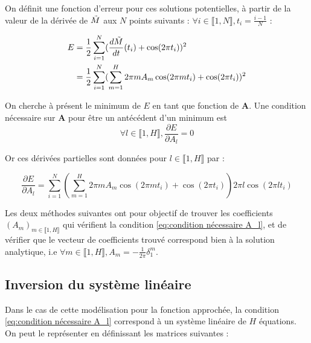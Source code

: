 \documentclass[12pt]{report}
\begin{document}
On définit une fonction d'erreur pour ces solutions potentielles, à partir de la valeur de la dérivée de $\Tilde{M}$ aux $N$ points suivants : $\forall i \in\llbracket 1,N \rrbracket, t_i = \frac{i-1}{N} $ :



\begin{equation}
    \begin{aligned}
        E &= \frac{1}{2}\sum_{i=1}^{N} (\frac{d\Tilde{M}}{dt}(t_i) +\cos(2\pi t_i))^2   \\
          &= \frac{1}{2}\sum_{i=1}^{N}(\sum_{m=1}^{H} 2\pi m A_m \cos(2\pi m t_i)+\cos(2\pi t_i))^2 
    \end{aligned}
\label{eq:fonction d'erreur}
\end{equation}

On cherche à présent le minimum de $E$ en tant que fonction de $\bm{A}$. Une condition nécessaire sur $\bm{A}$ pour être un antécédent d'un minimum est 
\begin{equation}
    {\forall l \in\llbracket 1,H \rrbracket, \frac{\partial E}{\partial A_l} = 0}
    \label{eq:condition nécessaire A_l}
\end{equation}

Or ces dérivées partielles sont données pour $l \in \llbracket 1,H \rrbracket$ par :

\begin{equation}
    \frac{\partial E}{\partial A_l} = 
    \sum_{i=1}^{N}(\sum_{m=1}^{H} 2\pi m A_m \cos(2\pi m t_i)+\cos(2\pi t_i))
    2\pi l \cos(2\pi l t_i)
\label{eq:gradient}
\end{equation}


Les deux méthodes suivantes ont pour objectif de trouver les coefficients $(A_m)_{m\in \llbracket 1,H \rrbracket}$ qui vérifient la condition \ref{eq:condition nécessaire A_l}, et de vérifier que le vecteur de coefficients trouvé correspond bien à la solution analytique, i.e $\forall m \in\llbracket 1,H \rrbracket, A_m = -\frac{1}{2\pi}\delta _1 ^m $.


\subsection{Inversion du système linéaire}

Dans le cas de cette modélisation pour la fonction approchée, la condition \ref{eq:condition nécessaire A_l} correspond à un système linéaire de $H$ équations. 
On peut le représenter en définissant les matrices suivantes :
\end{document}
